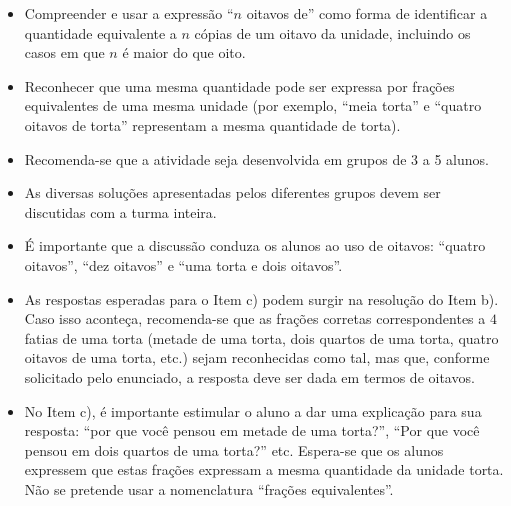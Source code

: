 \begin{multicols}{2}
\begin{objetivos}{}{}
\begin{itemize} %
\item Compreender e usar a expressão ``$n$ oitavos de'' como forma de identificar a quantidade equivalente a $n$ cópias de um oitavo da unidade, incluindo os casos em que $n$ é maior do que oito.
\item Reconhecer que uma mesma quantidade pode ser expressa por frações equivalentes de uma mesma unidade (por exemplo, ``meia torta'' e ``quatro oitavos de torta'' representam a mesma quantidade de torta).
\end{itemize} %
\end{objetivos}

\begin{orientacoes}

\begin{itemize} %
    \item Recomenda-se que a atividade seja desenvolvida em grupos de 3 a 5 alunos.
    \item As diversas soluções apresentadas pelos diferentes grupos devem ser discutidas com a turma inteira.
    \item É importante que a discussão conduza os alunos ao uso de oitavos:  ``quatro oitavos'', ``dez oitavos'' e ``uma torta e dois oitavos''.
     \item As respostas esperadas para o Item c) podem surgir na resolução do Item b). Caso isso aconteça, recomenda-se que as frações corretas correspondentes a $4$ fatias de uma torta (metade de uma torta, dois quartos de uma torta, quatro oitavos de uma torta, etc.) sejam reconhecidas como tal, mas que, conforme solicitado pelo enunciado, a resposta deve ser dada em termos de oitavos.
     \item No Item c), é importante estimular o aluno a dar uma explicação para sua resposta: ``por que você pensou em metade de uma torta?'', ``Por que você pensou em dois quartos de uma torta?'' etc. Espera-se que os alunos expressem que estas frações expressam a mesma quantidade da unidade torta. Não se pretende usar a nomenclatura ``frações equivalentes''.
\end{itemize}





\end{orientacoes}
\end{multicols}
